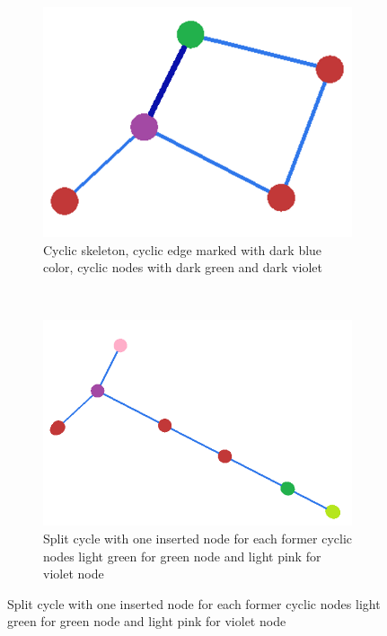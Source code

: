 \begin{figure}[ht]
        \centering
        \begin{subfigure}[b]{0.4\linewidth}
        \centering
			\includegraphics[width=0.9\linewidth]{images/cyclic_skeletons_1}
            \caption{Cyclic skeleton, cyclic edge marked with dark blue color, cyclic nodes with dark green and  dark violet}
            \label{fig:cycle_skeleton}
        \end{subfigure}%
        ~ %
        \begin{subfigure}[b]{0.4\linewidth}
        \centering
			\includegraphics[width=0.9\linewidth]{images/cyclic_skeletons_2}
            \caption{Split cycle with one inserted node for each former cyclic nodes light green for green node and light pink for violet node}
            \label{fig:cycle_break}
        \end{subfigure}

\end{figure}
